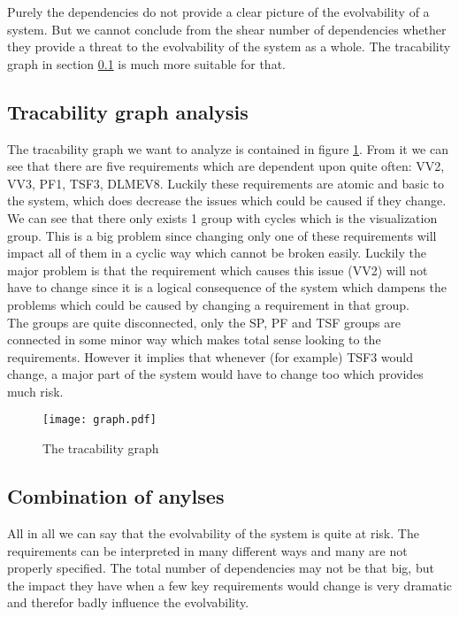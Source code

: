 \documentclass[a4paper,twoside,11pt]{article}
\begin{document}
Purely the dependencies do not provide a clear picture of the evolvability of a system. But we cannot conclude from the shear number of dependencies whether they provide a threat to the evolvability of the system as a whole. The tracability graph in section \ref{sec::aa_t} is much more suitable for that.


\subsection{Tracability graph analysis} 
\label{sec::aa_t}
The tracability graph we want to analyze is contained in figure \ref{fig:trac_grapph}. From it we can see that there are five requirements which are dependent upon quite often: {\sc VV2, VV3, PF1, TSF3, DLMEV8}. Luckily these requirements are atomic and basic to the system, which does decrease the issues which could be caused if they change.\\

We can see that there only exists 1 group with cycles which is the visualization group. This is a big problem since changing only one of these requirements will impact all of them in a cyclic way which cannot be broken easily. Luckily the major problem is that the requirement which causes this issue (VV2) will not have to change since it is a logical consequence of the system which dampens the problems which could be caused by changing a requirement in that group. \\

The groups are quite disconnected, only the SP, PF and TSF groups are connected in some minor way which makes total sense looking to the requirements. However it implies that whenever (for example) TSF3 would change, a major part of the system would have to change too which provides much risk.



\begin{figure}[p]
\texttt{[image: graph.pdf]}
\centering
\caption{The tracability graph}
\label{fig:trac_grapph}
\end{figure}


\subsection{Combination of anylses}
All in all we can say that the evolvability of the system is quite at risk. The requirements can be interpreted in many different ways and many are not properly specified. The total number of dependencies may not be that big, but the impact they have when a few key requirements would change is very dramatic and therefor badly influence the evolvability.\\
\end{document}
